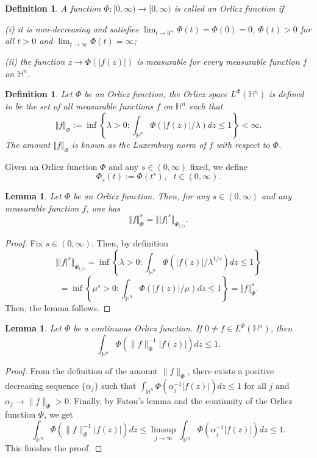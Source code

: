 \documentclass[oneside,10pt]{article}
\newtheorem{definition}[theorem]{Definition}
\newtheorem{lemma}[theorem]{Lemma}
\begin{document}
\begin{definition}
A function $\Phi : [0, \infty) \to [0, \infty)$ is called an Orlicz function if

(i) it is non-decreasing and satisfies $\lim_{t \to 0^{+}} \Phi(t) = \Phi(0) = 0$, $\Phi(t) > 0$ for all $t>0$ and 
$\lim_{t \to \infty} \Phi(t) = \infty$;

(ii) the function $z \to \Phi(\vert f(z) \vert)$ is measurable for every measurable function $f$ on $\mathbb{H}^n$.
\end{definition}

\begin{definition}
Let $\Phi$ be an Orlicz function, the Orlicz space $L^{\Phi}(\mathbb{H}^n)$ is defined to be the set of all measurable functions $f$ on 
$\mathbb{H}^n$ such that
\[
\Vert f \Vert_{\Phi} := \inf \left\{ \lambda > 0 : \int_{\mathbb{H}^n} \Phi(\vert f(z) \vert/ \lambda) dz \leq 1 \right\} < \infty. 
\]
The amount $\Vert f \Vert_{\Phi}$ is known as the Luxemburg norm of $f$ with respect to $\Phi$.
\end{definition}

Given an Orlicz function $\Phi$ and any $s \in (0, \infty)$ fixed, we define
\[
\Phi_s(t) := \Phi(t^s), \,\,\,\,  t \in (0, \infty).
\]

\begin{lemma} \label{fits}
Let $\Phi$ be an Orlicz function. Then, for any $s \in (0, \infty)$ and any measurable function $f$, one has
\[
\Vert f \Vert_{\Phi}^{s} = \Vert \vert f \vert^s \Vert_{\Phi_{1/s}}.
\]
\end{lemma}

\begin{proof}
Fix $s \in (0, \infty)$. Then, by definition
\[
\Vert \vert f \vert^s \Vert_{\Phi_{1/s}} = \inf \left\{ \lambda > 0 : \int_{\mathbb{H}^n} \Phi(\vert f(z) \vert/ \lambda^{1/s}) dz \leq 1 \right\} 
\]
\[
= \inf \left\{ \mu^s > 0 : \int_{\mathbb{H}^n} \Phi(\vert f(z) \vert/ \mu) dz \leq 1 \right\} = \Vert f \Vert_{\Phi}^{s}.
\]
Then, the lemma follows.
\end{proof}

\begin{lemma} \label{fi menor uno}
Let $\Phi$ be a continuous Orlicz function. If $0 \neq f \in L^{\Phi}(\mathbb{H}^n)$, then
\[
\int_{\mathbb{H}^n} \Phi \left( \| f \|^{-1}_{\Phi} |f(z)|  \right) dz \leq 1.
\] 
\end{lemma}

\begin{proof}
From the definition of the amount $\| f \|_{\Phi}$, there exists a positive decreasing sequence $\{ \alpha_j \}$ such that 
$\int_{\mathbb{H}^n} \Phi \left( \alpha^{-1}_j |f(z)|  \right) dz \leq 1$ for all $j$ and $\alpha_j \to \| f \|_{\Phi} > 0$. 
Finally, by Fatou's lemma and the continuity of the Orlicz function $\Phi$, we get
\[
\int_{\mathbb{H}^n} \Phi \left( \| f \|^{-1}_{\Phi} |f(z)|  \right) dz \leq 
\limsup_{j \to \infty} \int_{\mathbb{H}^n} \Phi \left( \alpha^{-1}_j |f(z)|  \right) dz \leq 1.
\]
This finishes the proof.
\end{proof}
\end{document}

